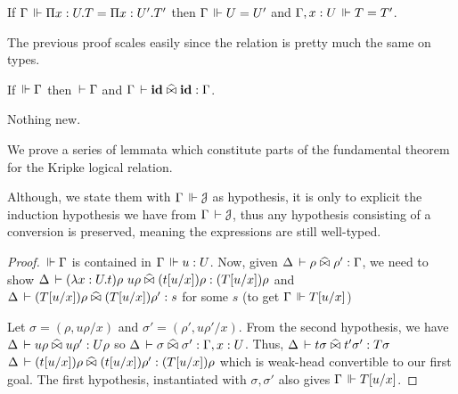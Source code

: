 \documentclass[a4paper,english]{lipics-utf8x}
\begin{document}
  \begin{lemma}
    \label{lem:fun-inj-valid}
    If $\Gamma \,\Vdash \Pi x:U.T = \Pi x:U'.T'$ then $\Gamma \,\Vdash U = U'$ and
    $\Gamma, x:U \,\Vdash T = T'$.
  \end{lemma}
  The previous proof scales easily since the relation is pretty much the same
  on types.

  \begin{lemma}
    If $\,\Vdash \Gamma$ then $\,\vdash \Gamma$ and $\Gamma \,\vdash \operatorname{\mathbf{id}} \mathrel{\widehat{\bowtie}} \operatorname{\mathbf{id}} : \Gamma$.
  \end{lemma}
  Nothing new.


  We prove a series of lemmata which constitute parts of the fundamental theorem
  for the Kripke logical relation.

  Although, we state them with $\Gamma \,\Vdash \mathcal{J}$ as hypothesis,
  it is only to explicit the induction hypothesis we have from
  $\Gamma \,\vdash \mathcal{J}$, thus any hypothesis consisting of a conversion
  is preserved, meaning the expressions are still well-typed.

  \begin{lemma}
    \leavevmode
    \begin{mathc}
    \end{mathc}
  \end{lemma}

  \begin{proof}
    $\,\Vdash \Gamma$ is contained in $\Gamma \,\Vdash u : U$.
    Now, given $\Delta \,\vdash \rho \mathrel{\widehat{\bowtie}} \rho' : \Gamma$, we need to show
    $\Delta \,\vdash (\lambda x:U.t)\rho\ u\rho \mathrel{\widehat{\bowtie}} (t[u/x])\rho : (T[u/x])\rho$
    and $\Delta \,\vdash (T[u/x])\rho \mathrel{\widehat{\bowtie}} (T[u/x])\rho' : s$ for some $s$
    (to get $\Gamma \,\Vdash T[u/x]$)

    Let $\sigma = (\rho, u \rho/x)$ and $\sigma' = (\rho', u \rho'/x)$.
    From the second hypothesis, we have
    $\Delta \,\vdash u \rho \mathrel{\widehat{\bowtie}} u \rho' : U \rho$
    so $\Delta \,\vdash \sigma \mathrel{\widehat{\bowtie}} \sigma' : \Gamma, x:U$.
    Thus, $\Delta \,\vdash t \sigma \mathrel{\widehat{\bowtie}} t' \sigma' : T\sigma$
    \ie $\Delta \,\vdash (t[u/x])\rho \mathrel{\widehat{\bowtie}} (t[u/x])\rho' : (T[u/x])\rho$
    which is weak-head convertible to our first goal.
    The first hypothesis, instantiated with $\sigma, \sigma'$ also gives
    $\Gamma \,\Vdash T[u/x]$.
  \end{proof}
\end{document}
